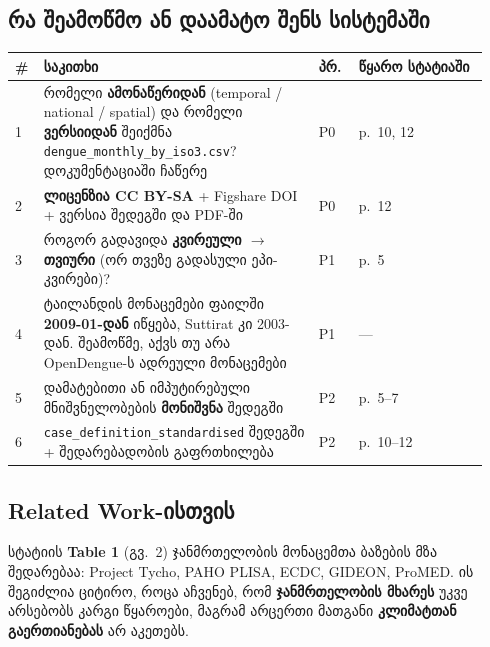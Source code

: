 \documentclass[11pt,a4paper]{article}
\begin{document}
\subsection*{რა შეამოწმო ან დაამატო შენს სისტემაში}
\begin{longtable}{@{}p{0.05\linewidth}p{0.55\linewidth}p{0.08\linewidth}p{0.26\linewidth}@{}}
\toprule
\textbf{\#} & \textbf{საკითხი} & \textbf{პრ.} & \textbf{წყარო სტატიაში}\\
\midrule
1 & რომელი \textbf{ამონაწერიდან} (temporal / national / spatial) და რომელი \textbf{ვერსიიდან} შეიქმნა \texttt{dengue\_monthly\_by\_iso3.csv}? დოკუმენტაციაში ჩაწერე & P0 & p.~10, 12\\
2 & \textbf{ლიცენზია CC BY-SA} + Figshare DOI + ვერსია შედეგში და PDF-ში & P0 & p.~12\\
3 & როგორ გადავიდა \textbf{კვირეული $\rightarrow$ თვიური} (ორ თვეზე გადასული ეპი-კვირები)? & P1 & p.~5\\
4 & ტაილანდის მონაცემები ფაილში \textbf{2009-01-დან} იწყება, Suttirat კი 2003-დან. შეამოწმე, აქვს თუ არა OpenDengue-ს ადრეული მონაცემები & P1 & ---\\
5 & დამატებითი ან იმპუტირებული მნიშვნელობების \textbf{მონიშვნა} შედეგში & P2 & p.~5--7\\
6 & \texttt{case\_definition\_standardised} შედეგში + შედარებადობის გაფრთხილება & P2 & p.~10--12\\
\bottomrule
\end{longtable}

\subsection*{Related Work-ისთვის}
სტატიის \textbf{Table 1} (გვ.~2) ჯანმრთელობის მონაცემთა ბაზების მზა შედარებაა: Project Tycho, PAHO PLISA, ECDC, GIDEON, ProMED.
ის შეგიძლია ციტირო, როცა აჩვენებ, რომ \textbf{ჯანმრთელობის მხარეს} უკვე არსებობს კარგი წყაროები, მაგრამ არცერთი მათგანი
\textbf{კლიმატთან გაერთიანებას} არ აკეთებს.
\end{document}
